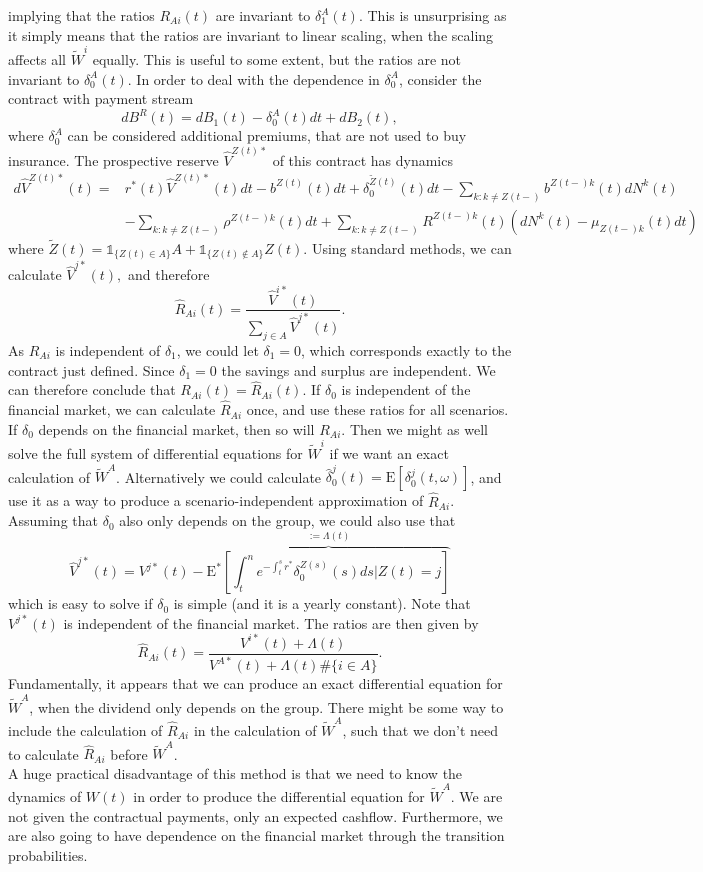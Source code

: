 \documentclass[12pt]{article}
\newcommand{\E}{\text{E}}
\newcommand{\indic}[1]{\mathds{1}_{ \{ #1 \} }}
\theoremstyle{my_thm}
\theoremstyle{my_def}
\theoremstyle{my_thm2}
\begin{document}
implying that the ratios $R_{Ai}(t)$ are invariant to $\delta_1^A(t)$. This is unsurprising as it simply means that the ratios are invariant to linear scaling, when the scaling affects all $\tilde{W}^i$ equally. This is useful to some extent, but the ratios are not invariant to $\delta_0^A(t)$. In order to deal with the dependence in $\delta_0^A$, consider the contract with payment stream
$$
dB^R(t)=dB_1(t)-\delta_0^A(t)dt + dB_2(t),
$$
where $\delta_0^A$ can be considered additional premiums, that are not used to buy insurance. The prospective reserve $\hat{V}^{Z(t)*}$ of this contract has dynamics
\begin{align*}
d\hat{V}^{Z(t)*}(t)=&r^*(t)\hat{V}^{Z(t)*}(t)dt - b^{Z(t)}(t) dt + \delta_0^{\tilde{Z}(t)}(t)dt-\sum_{k:k \neq Z(t-)} b^{Z(t-)k}(t) dN^k(t)
\\
&- \sum_{k: k\neq Z(t-)} \rho^{Z(t-)k}(t) dt + \sum_{k: k\neq Z(t-)}R^{Z(t-)k}(t)\left(dN^k(t)-\mu_{Z(t-)k}(t) dt\right)
\end{align*}
where $\tilde{Z}(t)=\indic{Z(t) \in A} A+ \indic{Z(t) \notin A} Z(t)$. Using standard methods, we can calculate
$
\hat{V}^{j*}(t),
$
and therefore
$$
\hat{R}_{Ai}(t)=\frac{\hat{V}^{i*}(t)}{\sum_{j \in A} \hat{V}^{j*}(t)}.
$$
As $R_{Ai}$ is independent of $\delta_1$, we could let $\delta_1=0$, which corresponds exactly to the contract just defined. Since $\delta_1=0$ the savings and surplus are independent. We can therefore conclude that $R_{Ai}(t)=\hat{R}_{Ai}(t)$. If $\delta_0$ is independent of the financial market, we can calculate $\hat{R}_{Ai}$ once, and use these ratios for all scenarios. If $\delta_0$ depends on the financial market, then so will $R_{Ai}$. Then we might as well solve the full system of differential equations for $\tilde{W}^i$ if we want an exact calculation of $\tilde{W}^A$. Alternatively we could calculate $\hat{\delta}^j_0(t)=\E [ \delta^j_0(t,\omega)]$, and use it as a way to produce a scenario-independent approximation of $\hat{R}_{Ai}$. \\[12pt]
Assuming that $\delta_0$ also only depends on the group, we could also use that
$$
\hat{V}^{j*}(t)=V^{j*}(t)- \overbrace{\E^* \left[ \int_t^n e^{-\int_t^s r^*} \delta^{Z(s)}_0(s) ds|Z(t)=j\right]}^{:=\Lambda(t)}
$$
which is easy to solve if $\delta_0$ is simple (and it is a yearly constant). Note that $V^{j*}(t)$ is independent of the financial market. The ratios are then given by
$$
\hat{R}_{Ai}(t)=\frac{V^{i*}(t)+\Lambda(t)}{V^{A*}(t)+ \Lambda(t) \#\{i \in A \} }.
$$
Fundamentally, it appears that we can produce an exact differential equation for $\tilde{W}^A$, when the dividend only depends on the group. There might be some way to include the calculation of $\hat{R}_{Ai}$ in the calculation of $\tilde{W}^A$, such that we don't need to calculate $\hat{R}_{Ai}$ before $\tilde{W}^A$. 
\\[12pt]
A huge practical disadvantage of this method is that we need to know the dynamics of $W(t)$ in order to produce the differential equation for $\tilde{W}^A$. We are not given the contractual payments, only an expected cashflow. Furthermore, we are also going to have dependence on the financial market through the transition probabilities.
\end{document}
